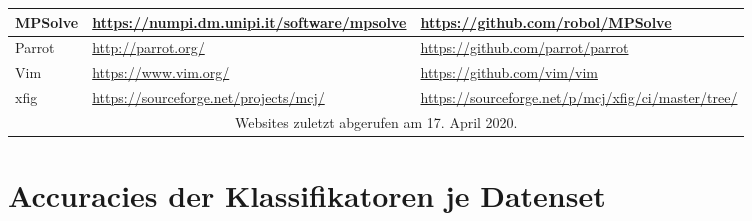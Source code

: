 \documentclass[master,twoside,extern,palatino]{rgseThesis}
\begin{document}
\begin{table}[ht]
{\begin{tabular}{|l|l|l|}
\hline
MPSolve               & \url{https://numpi.dm.unipi.it/software/mpsolve} & \url{https://github.com/robol/MPSolve}                    \\ 
\hline
Parrot                & \url{http://parrot.org/}                         & \url{https://github.com/parrot/parrot}                    \\ 
\hline
Vim                   & \url{https://www.vim.org/}                       & \url{https://github.com/vim/vim}                          \\ 
\hline
xfig                  & \url{https://sourceforge.net/projects/mcj/}      & \url{https://sourceforge.net/p/mcj/xfig/ci/master/tree/}  \\ 
\hline
\multicolumn{3}{|c|}{Websites zuletzt abgerufen am 17. April 2020.}                                                      \\
\hline
\end{tabular}
}
\end{table}

\chapter{Accuracies der Klassifikatoren je Datenset}
\label{appendix2}

\begin{table}[ht]
\centering
\caption{Accuracies des featurebasierten Datensets}
\label{tab:accuracies-feat}
\end{table}
\end{document}

